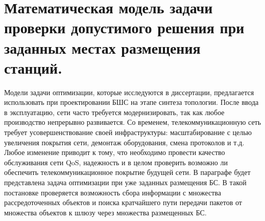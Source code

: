 





\section{Математическая модель задачи проверки допустимого решения  при заданных местах размещения станций.}
Модели задачи оптимизации, которые исследуются в диссертации, предлагается использовать при проектировании БШС на этапе синтеза топологии. После ввода в эксплуатацию, сети часто требуется модернизировать, так как любое производство непрерывно развивается. Со временем, телекоммуникационную сеть требует усовершенствование своей инфраструктуры: масштабирование с целью увеличения покрытия сети, демонтаж оборудования, смена протоколов и т.д. Любое изменение приводит к тому, что необходимо провести качество обслуживания сети QoS, надежность и в целом проверить возможно ли обеспечить телекоммуникационное покрытие будущей сети. В параграфе будет представлена задача оптимизации при уже заданных размещения БС. В такой постановке проверяется возможность сбора информации с множества рассредоточенных объектов и поиска кратчайшего пути передачи пакетов от множества объектов к шлюзу через множества размещенных БС.


